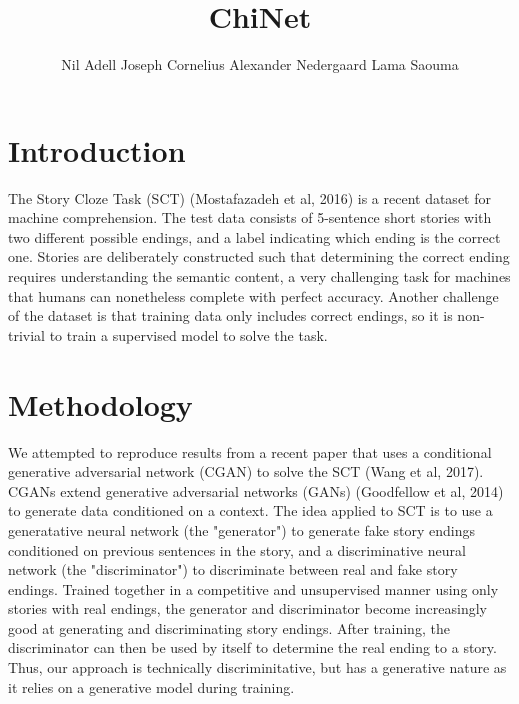 \documentclass{article}
\title{ChiNet}
\author{Nil Adell \qquad Joseph Cornelius \qquad Alexander Nedergaard \qquad Lama Saouma}
\begin{document}

\maketitle


\section{Introduction}
The Story Cloze Task (SCT) (Mostafazadeh et al, 2016) is a recent dataset for machine comprehension. The test data consists of 5-sentence short stories with two different possible endings, and a label indicating which ending is the correct one. Stories are deliberately constructed such that determining the correct ending requires understanding the semantic content, a very challenging task for machines that humans can nonetheless complete with perfect accuracy. Another challenge of the dataset is that training data only includes correct endings, so it is non-trivial to train a supervised model to solve the task.
\section{Methodology}
We attempted to reproduce results from a recent paper that uses a conditional generative adversarial network (CGAN) to solve the SCT (Wang et al, 2017). CGANs extend generative adversarial networks (GANs) (Goodfellow et al, 2014) to generate data conditioned on a context. The idea applied to SCT is to use a generatative neural network (the "generator") to generate fake story endings conditioned on previous sentences in the story, and a discriminative neural network (the "discriminator") to discriminate between real and fake story endings. Trained together in a competitive and unsupervised manner using only stories with real endings, the generator and discriminator become increasingly good at generating and discriminating story endings. After training, the discriminator can then be used by itself to determine the real ending to a story. Thus, our approach is technically discriminitative, but has a generative nature as it relies on a generative model during training.
\end{document}
